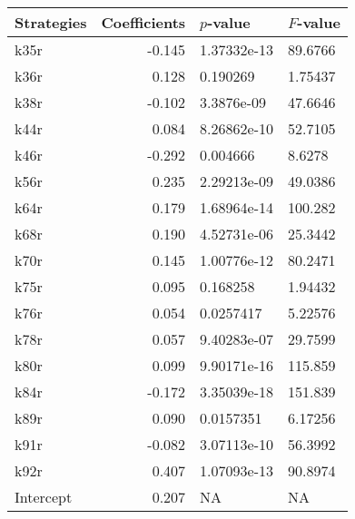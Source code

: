 \begin{tabular}{lrll}
\toprule
Strategies &  Coefficients &    $p$-value & $F$-value \\
\midrule
      k35r &        -0.145 &  1.37332e-13 &   89.6766 \\
      k36r &         0.128 &     0.190269 &   1.75437 \\
      k38r &        -0.102 &   3.3876e-09 &   47.6646 \\
      k44r &         0.084 &  8.26862e-10 &   52.7105 \\
      k46r &        -0.292 &     0.004666 &    8.6278 \\
      k56r &         0.235 &  2.29213e-09 &   49.0386 \\
      k64r &         0.179 &  1.68964e-14 &   100.282 \\
      k68r &         0.190 &  4.52731e-06 &   25.3442 \\
      k70r &         0.145 &  1.00776e-12 &   80.2471 \\
      k75r &         0.095 &     0.168258 &   1.94432 \\
      k76r &         0.054 &    0.0257417 &   5.22576 \\
      k78r &         0.057 &  9.40283e-07 &   29.7599 \\
      k80r &         0.099 &  9.90171e-16 &   115.859 \\
      k84r &        -0.172 &  3.35039e-18 &   151.839 \\
      k89r &         0.090 &    0.0157351 &   6.17256 \\
      k91r &        -0.082 &  3.07113e-10 &   56.3992 \\
      k92r &         0.407 &  1.07093e-13 &   90.8974 \\
 Intercept &         0.207 &           NA &        NA \\
\bottomrule
\end{tabular}
